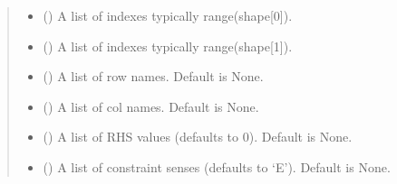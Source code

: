 \documentclass[letterpaper,12pt,english]{sphinxmanual}
\begin{document}
\begin{fulllineitems}
\begin{fulllineitems}
\begin{quote}
\begin{description}
\begin{itemize}
\item {} 
\sphinxAtStartPar
{} () \textendash{} A list of indexes typically range(shape{[}0{]}).

\item {} 
\sphinxAtStartPar
{} () \textendash{} A list of indexes typically range(shape{[}1{]}).

\item {} 
\sphinxAtStartPar
{} (\sphinxstyleliteralemphasis{\sphinxupquote{, }}) \textendash{} A list of row names. Default is None.

\item {} 
\sphinxAtStartPar
{} (\sphinxstyleliteralemphasis{\sphinxupquote{, }}) \textendash{} A list of col names. Default is None.

\item {} 
\sphinxAtStartPar
{} (\sphinxstyleliteralemphasis{\sphinxupquote{, }}) \textendash{} A list of RHS values (defaults to 0). Default is None.

\item {} 
\sphinxAtStartPar
{} (\sphinxstyleliteralemphasis{\sphinxupquote{, }}) \textendash{} A list of constraint senses (defaults to ‘E’). Default is None.


\end{itemize}
\end{description}
\end{quote}
\end{fulllineitems}
\end{fulllineitems}
\end{document}
